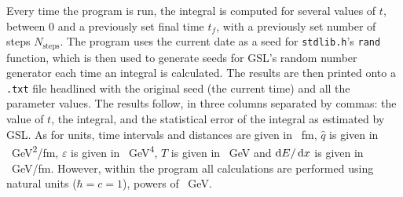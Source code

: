 Every time the program is run, the integral is computed for several values of $t$, between $0$ and a previously set final time $t_f$, with a previously set number of steps $N_\text{steps}$. The program uses the current date as a seed for \texttt{stdlib.h}'s \texttt{rand} function, which is then used to generate seeds for \gls{GSL}'s random number generator each time an integral is calculated. The results are  then printed onto a \texttt{.txt} file headlined with the original seed (the current time) and all the parameter values. The results follow, in three columns separated by commas: the value of $t$, the integral, and the statistical error of the integral as estimated by \gls{GSL}. As for units, time intervals and distances are given in \qty{}{fm}, $\hat{q}$ is given in \qty{}{GeV^2/fm}, $\varepsilon$ is given in \qty{}{GeV^4}, $T$ is given in \qty{}{GeV} and $\mathop{}\!\mathrm{d} E / \mathop{}\!\mathrm{d} x$ is given in \qty{}{GeV/fm}. However, within the program all calculations are performed using natural units ($\hbar = c = 1$), powers of \qty{}{GeV}.
